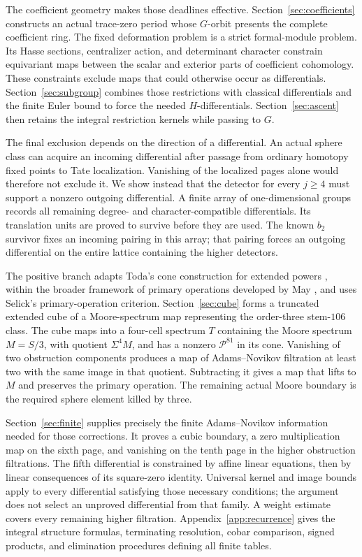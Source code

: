 \documentclass[11pt]{article}
\theoremstyle{definition}
\theoremstyle{remark}
\numberwithin{equation}{section}
\begin{document}
The coefficient geometry makes those deadlines effective. Section~\ref{sec:coefficients} constructs an actual trace-zero period whose $G$-orbit presents the complete coefficient ring. The fixed deformation problem is a strict formal-module problem. Its Hasse sections, centralizer action, and determinant character constrain equivariant maps between the scalar and exterior parts of coefficient cohomology. These constraints exclude maps that could otherwise occur as differentials. Section~\ref{sec:subgroup} combines those restrictions with classical differentials and the finite Euler bound to force the needed $H$-differentials. Section~\ref{sec:ascent} then retains the integral restriction kernels while passing to $G$.

The final exclusion depends on the direction of a differential. An actual sphere class can acquire an incoming differential after passage from ordinary homotopy fixed points to Tate localization. Vanishing of the localized pages alone would therefore not exclude it. We show instead that the detector for every $j\geq4$ must support a nonzero outgoing differential. A finite array of one-dimensional groups records all remaining degree- and character-compatible differentials. Its translation units are proved to survive before they are used. The known $b_2$ survivor fixes an incoming pairing in this array; that pairing forces an outgoing differential on the entire lattice containing the higher detectors.

The positive branch adapts Toda's cone construction for extended powers \cite[Section~1, Theorem~2]{TodaExtended}, within the broader framework of primary operations developed by May \cite[Sections~2--3]{MayOperations}, and uses Selick's primary-operation criterion. Section~\ref{sec:cube} forms a truncated extended cube of a Moore-spectrum map representing the order-three stem-$106$ class. The cube maps into a four-cell spectrum $T$ containing the Moore spectrum $M=S/3$, with quotient $\Sigma^4M$, and has a nonzero $\mathcal P^{81}$ in its cone. Vanishing of two obstruction components produces a map of Adams--Novikov filtration at least two with the same image in that quotient. Subtracting it gives a map that lifts to $M$ and preserves the primary operation. The remaining actual Moore boundary is the required sphere element killed by three.

Section~\ref{sec:finite} supplies precisely the finite Adams--Novikov information needed for those corrections. It proves a cubic boundary, a zero multiplication map on the sixth page, and vanishing on the tenth page in the higher obstruction filtrations. The fifth differential is constrained by affine linear equations, then by linear consequences of its square-zero identity. Universal kernel and image bounds apply to every differential satisfying those necessary conditions; the argument does not select an unproved differential from that family. A weight estimate covers every remaining higher filtration. Appendix~\ref{app:recurrence} gives the integral structure formulas, terminating resolution, cobar comparison, signed products, and elimination procedures defining all finite tables.
\end{document}
